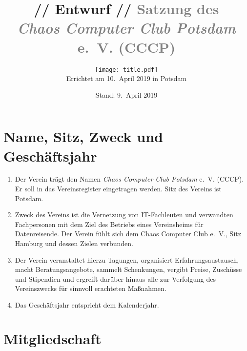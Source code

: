 \documentclass[a4paper, 10pt, headings=normal]{scrartcl}
\title{\textcolor{alert}{// Entwurf //} \textcolor{gray}{Satzung des \\ \emph{Chaos Computer Club Potsdam} e.~V. (CCCP)}}
\author{\texttt{[image: title.pdf]} \\[10pt] Errichtet am 10.~April 2019 in Potsdam}
\date{Stand: 9.~April 2019}
\begin{document}
\maketitle
\pagestyle{myheadings}

\begin{multicols}{2}

\section{Name, Sitz, Zweck und Geschäftsjahr}
\label{par:name-sitz-zweck}

\begin{enumerate}[label={(\arabic*)}]
	\item
		Der Verein trägt den Namen \emph{Chaos Computer Club Potsdam} e.~V. (CCCP).
		Er soll in das Vereinsregister eingetragen werden.
		Sitz des Vereins ist Potsdam.
	\item
		Zweck des Vereins ist die Vernetzung von IT-Fachleuten und verwandten Fachpersonen mit dem Ziel des Betriebs eines Vereinsheims für Datenreisende.
		Der Verein fühlt sich dem Chaos Computer Club e.~V., Sitz Hamburg und dessen Zielen verbunden.
	\item
		Der Verein veranstaltet hierzu Tagungen, organisiert Erfahrungsaustausch, macht Beratungsangebote, sammelt Schenkungen, vergibt Preise, Zuschüsse und Stipendien und ergreift darüber hinaus alle zur Verfolgung des Vereinszwecks für sinnvoll erachteten Maßnahmen.
	\item
		Das Geschäftsjahr entspricht dem Kalenderjahr.
\end{enumerate}

\section{Mitgliedschaft}
\label{par:mitgliedschaft}


\end{multicols}
\end{document}
